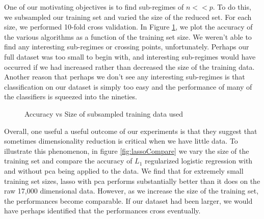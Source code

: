 One of our motivating objectives is to find sub-regimes of $n << p$. To do this, we subsampled our training set and varied the size of the reduced set. For each size, we performed 10-fold cross validation. In Figure \ref{fig:largecompareAcc}, we plot the accuracy of the various algorithms as a function of the training set size. We weren't able to find any interesting sub-regimes or crossing points, unfortunately. Perhaps our full dataset was too small to begin with, and interesting sub-regimes would have occurred if we had increased rather than decreased the size of the training data. Another reason that perhaps we don't see any interesting sub-regimes is that classification on our dataset is simply too easy and the performance of many of the classifiers is squeezed into the nineties. 

\begin{center}
\begin{figure}[!ht]
\centering
{}
\caption{Accuracy vs Size of subsampled training data used}
\label{fig:largecompareAcc}
\par
\end{figure}
\end{center}


Overall, one useful a useful outcome of our experiments is that they suggest that sometimes dimensionality reduction is critical when we have little data. To illustrate this phenomenon, in figure \ref{fig:lassoCompare} we vary the size of the training set and compare the accuracy of  $L_1$ regularized logistic regression with and without pca being applied to the data. We find that for extremely small training set sizes, lasso with pca performs substantially better than it does on the raw 17,000 dimensional data. However, as we increase the size of the training set, the performances become comparable. If our dataset had been larger, we would have perhaps identified that the performances cross eventually. 

